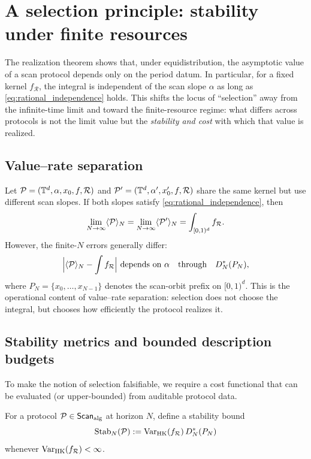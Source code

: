 
\section{A selection principle: stability under finite resources}
\label{sec:selection_principle}

The realization theorem shows that, under equidistribution, the asymptotic value of a scan protocol depends only on the period datum. In particular, for a fixed kernel $f_{\mathcal{R}}$, the integral is independent of the scan slope $\alpha$ as long as \eqref{eq:rational_independence} holds. This shifts the locus of ``selection'' away from the infinite-time limit and toward the finite-resource regime: what differs across protocols is not the limit value but the \emph{stability and cost} with which that value is realized.

\subsection{Value--rate separation}
\label{sec:value_rate_separation}

Let $\mathcal{P}=(\mathbb{T}^d,\alpha,x_0,f,\mathcal{R})$ and $\mathcal{P}'=(\mathbb{T}^d,\alpha',x_0',f,\mathcal{R})$ share the same kernel but use different scan slopes. If both slopes satisfy \eqref{eq:rational_independence}, then
\[
\lim_{N\to\infty}\langle \mathcal{P} \rangle_N
=
\lim_{N\to\infty}\langle \mathcal{P}' \rangle_N
=\int_{[0,1)^d} f_{\mathcal{R}}.
\]
However, the finite-$N$ errors generally differ:
\[
\Big|\langle \mathcal{P} \rangle_N-\int f_{\mathcal{R}}\Big|
\ \text{depends on}\ \alpha
\quad\text{through}\quad
D_N^\ast(P_N),
\]
where $P_N=\{x_0,\dots,x_{N-1}\}$ denotes the scan-orbit prefix on $[0,1)^d$.
This is the operational content of value--rate separation: selection does not choose the integral, but chooses how efficiently the protocol realizes it.

\subsection{Stability metrics and bounded description budgets}
\label{sec:stability_metrics}

To make the notion of selection falsifiable, we require a cost functional that can be evaluated (or upper-bounded) from auditable protocol data.

\begin{definition}
\label{def:stability_bound}
For a protocol $\mathcal{P}\in\mathsf{Scan}_{\mathrm{alg}}$ at horizon $N$, define a stability bound
\begin{equation}
\label{eq:stability_bound}
\mathrm{Stab}_N(\mathcal{P})
:= \mathrm{Var}_{\mathrm{HK}}(f_{\mathcal{R}})\,D_N^\ast(P_N)
\end{equation}
whenever $\mathrm{Var}_{\mathrm{HK}}(f_{\mathcal{R}})<\infty$.
\end{definition}

